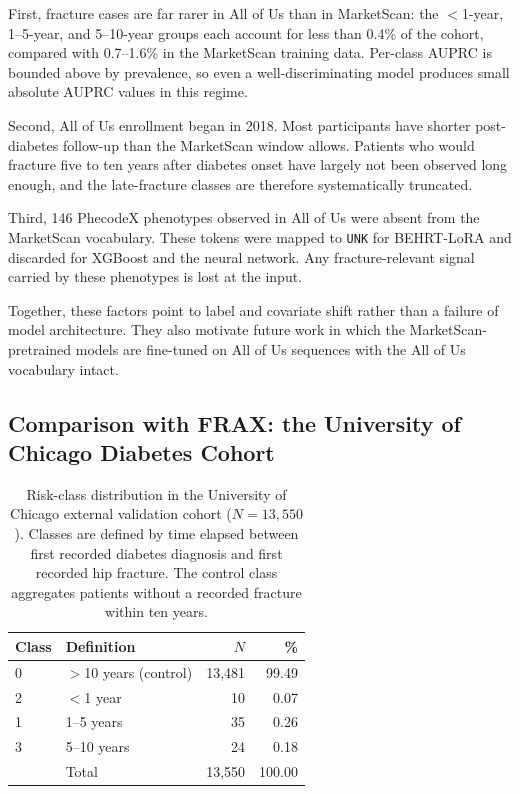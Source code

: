 \documentclass[12pt]{article}
\begin{document}
First, fracture cases are far rarer in All of Us than in MarketScan: the $<$1-year, 1--5-year, and 5--10-year groups each account for less than 0.4\% of the cohort, compared with 0.7--1.6\% in the MarketScan training data. Per-class AUPRC is bounded above by prevalence, so even a well-discriminating model produces small absolute AUPRC values in this regime.

Second, All of Us enrollment began in 2018. Most participants have shorter post-diabetes follow-up than the MarketScan window allows. Patients who would fracture five to ten years after diabetes onset have largely not been observed long enough, and the late-fracture classes are therefore systematically truncated.

Third, 146 PhecodeX phenotypes observed in All of Us were absent from the MarketScan vocabulary. These tokens were mapped to \texttt{UNK} for BEHRT-LoRA and discarded for XGBoost and the neural network. Any fracture-relevant signal carried by these phenotypes is lost at the input.

Together, these factors point to label and covariate shift rather than a failure of model architecture. They also motivate future work in which the MarketScan-pretrained models are fine-tuned on All of Us sequences with the All of Us vocabulary intact.

\subsection{Comparison with FRAX: the University of Chicago Diabetes Cohort}

\begin{table}[H]
  \centering
  \caption{Risk-class distribution in the University of Chicago external validation cohort
  ($N = 13{,}550$). Classes are defined by time elapsed between first recorded
  diabetes diagnosis and first recorded hip fracture. The control class
  aggregates patients without a recorded fracture within ten years.}
  \label{tab:uchicago_distribution}
  \begin{tabular}{llrr}
  \toprule
  Class & Definition & $N$ & \% \\
  \midrule
  0 & $>$10 years (control) & 13,481 & 99.49 \\
  2 & $<$1 year             &     10 &  0.07 \\
  1 & 1--5 years            &     35 &  0.26 \\
  3 & 5--10 years           &     24 &  0.18 \\
  \midrule
    & Total                 & 13,550 & 100.00 \\
  \bottomrule
  \end{tabular}
\end{table}
\end{document}
